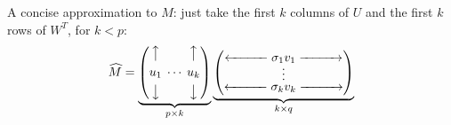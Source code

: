 \documentclass[smaller]{beamer}
\def\darkred{\color{red!70!black}}
\def\darkgreen{\color{green!60!black}}
\def\vone{{\vskip.1in}}
\begin{document}
\begin{frame}
\pause
{\darkred A concise approximation to $M$: just take the first $k$ columns of $U$ and the first $k$ rows of $W^T$, for $k < p$:
$$
\widehat{M} =
\underbrace{\begin{pmatrix}
\big\uparrow    &         & \big\uparrow \\[.05in]
u_1             &  \hskip-.2in\cdots\hskip-.2in & u_k  \\[.05in]
\big\downarrow  &         & \big\downarrow
\end{pmatrix}}_{p \times k}
\underbrace{\begin{pmatrix} 
\xleftarrow{\hspace*{1cm}} \sigma_1 v_1 \xrightarrow{\hspace*{1cm}} \\[-.05in]
\vdots \\[-0.05in]
\xleftarrow{\hspace*{1cm}} \sigma_k v_k \xrightarrow{\hspace*{1cm}} 
\end{pmatrix}}_{k \times q}
$$}

\end{frame}

\end{document}
